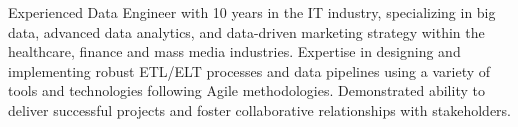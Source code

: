 

\begin{onecolentry}
    Experienced Data Engineer with 10 years in the IT industry, specializing in big data, advanced data analytics, and data-driven marketing strategy within the healthcare, finance and mass media industries. Expertise in designing and implementing robust ETL/ELT processes and data pipelines using a variety of tools and technologies following Agile methodologies. Demonstrated ability to deliver successful projects and foster collaborative relationships with stakeholders.
\end{onecolentry}